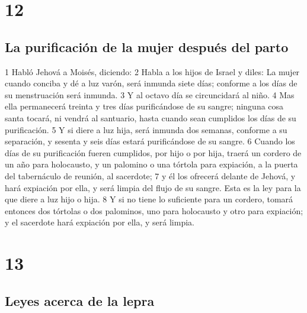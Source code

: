 \chapter{12}

\section*{La purificación de la mujer después del parto}

1 Habló Jehová a Moisés, diciendo:
2 Habla a los hijos de Israel y diles: La mujer cuando conciba y dé a luz varón, será inmunda siete días; conforme a los días de su menstruación será inmunda.
3 Y al octavo día se circuncidará al niño.
4 Mas ella permanecerá treinta y tres días purificándose de su sangre; ninguna cosa santa tocará, ni vendrá al santuario, hasta cuando sean cumplidos los días de su purificación.
5 Y si diere a luz hija, será inmunda dos semanas, conforme a su separación, y sesenta y seis días estará purificándose de su sangre.
6 Cuando los días de su purificación fueren cumplidos, por hijo o por hija, traerá un cordero de un año para holocausto, y un palomino o una tórtola para expiación, a la puerta del tabernáculo de reunión, al sacerdote;
7 y él los ofrecerá delante de Jehová, y hará expiación por ella, y será limpia del flujo de su sangre. Esta es la ley para la que diere a luz hijo o hija.
8 Y si no tiene lo suficiente para un cordero, tomará entonces dos tórtolas o dos palominos, uno para holocausto y otro para expiación; y el sacerdote hará expiación por ella, y será limpia.

\chapter{13}

\section*{Leyes acerca de la lepra}

